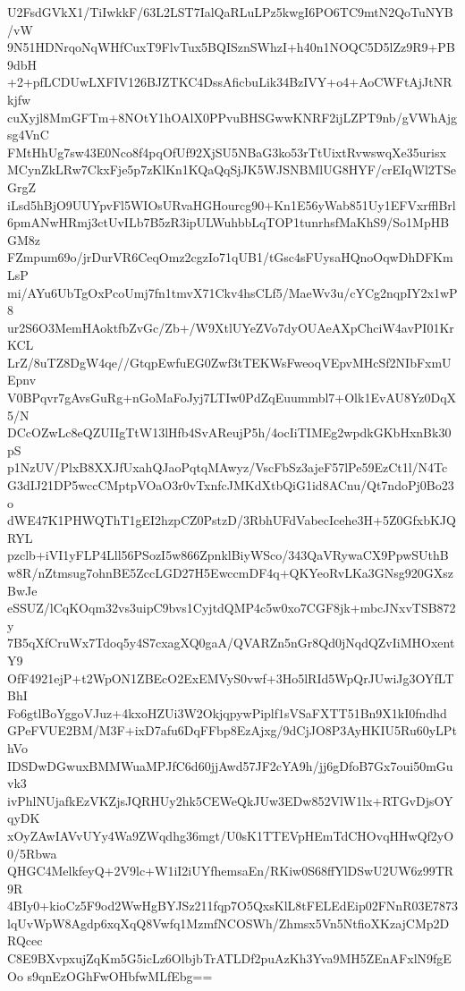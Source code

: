U2FsdGVkX1/TiIwkkF/63L2LST7IalQaRLuLPz5kwgI6PO6TC9mtN2QoTuNYB/vW
9N51HDNrqoNqWHfCuxT9FlvTux5BQISznSWhzI+h40n1NOQC5D5lZz9R9+PB9dbH
+2+pfLCDUwLXFIV126BJZTKC4DssAficbuLik34BzIVY+o4+AoCWFtAjJtNRkjfw
cuXyjl8MmGFTm+8NOtY1hOAlX0PPvuBHSGwwKNRF2ijLZPT9nb/gVWhAjgsg4VnC
FMtHhUg7sw43E0Nco8f4pqOfUf92XjSU5NBaG3ko53rTtUixtRvwswqXe35urisx
MCynZkLRw7CkxFje5p7zKlKn1KQaQqSjJK5WJSNBMlUG8HYF/crEIqWl2TSeGrgZ
iLsd5hBjO9UUYpvFl5WIOsURvaHGHourcg90+Kn1E56yWab851Uy1EFVxrfflBrl
6pmANwHRmj3ctUvILb7B5zR3ipULWuhbbLqTOP1tunrhsfMaKhS9/So1MpHBGM8z
FZmpum69o/jrDurVR6CeqOmz2cgzIo71qUB1/tGsc4sFUysaHQnoOqwDhDFKmLsP
mi/AYu6UbTgOxPcoUmj7fn1tmvX71Ckv4hsCLf5/MaeWv3u/cYCg2nqpIY2x1wP8
ur2S6O3MemHAoktfbZvGc/Zb+/W9XtlUYeZVo7dyOUAeAXpChciW4avPI01KrKCL
LrZ/8uTZ8DgW4qe//GtqpEwfuEG0Zwf3tTEKWsFweoqVEpvMHcSf2NIbFxmUEpnv
V0BPqvr7gAvsGuRg+nGoMaFoJyj7LTIw0PdZqEuummbl7+Olk1EvAU8Yz0DqX5/N
DCcOZwLc8eQZUIIgTtW13lHfb4SvAReujP5h/4ocIiTIMEg2wpdkGKbHxnBk30pS
p1NzUV/PlxB8XXJfUxahQJaoPqtqMAwyz/VscFbSz3ajeF57lPe59EzCt1l/N4Tc
G3dIJ21DP5wccCMptpVOaO3r0vTxnfcJMKdXtbQiG1id8ACnu/Qt7ndoPj0Bo23o
dWE47K1PHWQThT1gEI2hzpCZ0PstzD/3RbhUFdVabecIcehe3H+5Z0GfxbKJQRYL
pzclb+iVI1yFLP4Lll56PSozI5w866ZpnklBiyWSco/343QaVRywaCX9PpwSUthB
w8R/nZtmsug7ohnBE5ZccLGD27H5EwccmDF4q+QKYeoRvLKa3GNsg920GXszBwJe
eSSUZ/lCqKOqm32vs3uipC9bvs1CyjtdQMP4c5w0xo7CGF8jk+mbcJNxvTSB872y
7B5qXfCruWx7Tdoq5y4S7cxagXQ0gaA/QVARZn5nGr8Qd0jNqdQZvIiMHOxentY9
OfF4921ejP+t2WpON1ZBEcO2ExEMVyS0vwf+3Ho5lRId5WpQrJUwiJg3OYfLTBhI
Fo6gtlBoYggoVJuz+4kxoHZUi3W2OkjqpywPiplf1sVSaFXTT51Bn9X1kI0fndhd
GPeFVUE2BM/M3F+ixD7afu6DqFFbp8EzAjxg/9dCjJO8P3AyHKIU5Ru60yLPthVo
IDSDwDGwuxBMMWuaMPJfC6d60jjAwd57JF2cYA9h/jj6gDfoB7Gx7oui50mGuvk3
ivPhlNUjafkEzVKZjsJQRHUy2hk5CEWeQkJUw3EDw852VlW1lx+RTGvDjsOYqyDK
xOyZAwIAVvUYy4Wa9ZWqdhg36mgt/U0sK1TTEVpHEmTdCHOvqHHwQf2yO0/5Rbwa
QHGC4MelkfeyQ+2V9lc+W1iI2iUYfhemsaEn/RKiw0S68ffYlDSwU2UW6z99TR9R
4BIy0+kioCz5F9od2WwHgBYJSz211fqp7O5QxsKlL8tFELEdEip02FNnR03E7873
lqUvWpW8Agdp6xqXqQ8Vwfq1MzmfNCOSWh/Zhmsx5Vn5NtfioXKzajCMp2DRQcec
C8E9BXvpxujZqKm5G5icLz6OlbjbTrATLDf2puAzKh3Yva9MH5ZEnAFxlN9fgEOo
s9qnEzOGhFwOHbfwMLfEbg==
